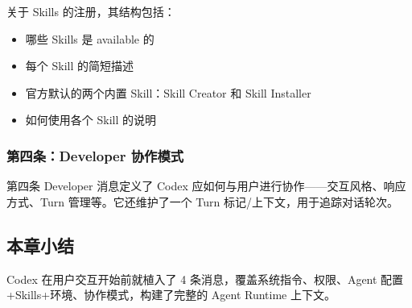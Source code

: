 关于 Skills 的注册，其结构包括：
\begin{itemize}
    \item 哪些 Skills 是 available 的
    \item 每个 Skill 的简短描述
    \item 官方默认的两个内置 Skill：Skill Creator 和 Skill Installer
    \item 如何使用各个 Skill 的说明
\end{itemize}

\subsubsection{第四条：Developer 协作模式}

第四条 Developer 消息定义了 Codex 应如何与用户进行协作——交互风格、响应方式、Turn 管理等。它还维护了一个 Turn 标记/上下文，用于追踪对话轮次。

\subsection{本章小结}

Codex 在用户交互开始前就植入了 4 条消息，覆盖系统指令、权限、Agent 配置+Skills+环境、协作模式，构建了完整的 Agent Runtime 上下文。


